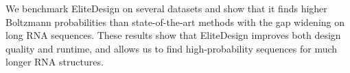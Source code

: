 We benchmark EliteDesign on several datasets and show that it finds higher Boltzmann probabilities than state-of-the-art methods
with the gap widening on
long RNA sequences. These results show that EliteDesign improves both design quality and
runtime,
and allows us to
find high-probability sequences for much longer RNA structures.

